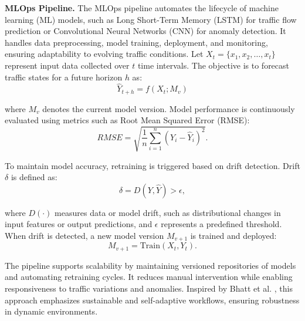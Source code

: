 \textbf{MLOps Pipeline.}  
The MLOps pipeline automates the lifecycle of machine learning (ML) models, such as Long Short-Term Memory (LSTM) for traffic flow prediction or Convolutional Neural Networks (CNN) for anomaly detection. It handles data preprocessing, model training, deployment, and monitoring, ensuring adaptability to evolving traffic conditions. Let $X_t = \{x_1, x_2, \dots, x_t\}$ represent input data collected over $t$ time intervals. The objective is to forecast traffic states for a future horizon $h$ as:
\vspace{0.5mm}
\[
\hat{Y}_{t+h} = f(X_t; M_v)
\]

\noindent where $M_v$ denotes the current model version. Model performance is continuously evaluated using metrics such as Root Mean Squared Error (RMSE):
\vspace{0.5mm}
\[
RMSE = \sqrt{\frac{1}{n} \sum_{i=1}^{n} (Y_i - \hat{Y}_i)^2}.
\]

\noindent To maintain model accuracy, retraining is triggered based on drift detection. Drift $\delta$ is defined as:
\vspace{0.5mm}
\[
\delta = D(Y, \hat{Y}) > \epsilon,
\]

\noindent where $D(\cdot)$ measures data or model drift, such as distributional changes in input features or output predictions, and $\epsilon$ represents a predefined threshold. When drift is detected, a new model version $M_{v+1}$ is trained and deployed:
\vspace{0.5mm}
\[
M_{v+1} = \text{Train}(X_t, Y_t).
\]

The pipeline supports scalability by maintaining versioned repositories of models and automating retraining cycles. It reduces manual intervention while enabling responsiveness to traffic variations and anomalies. Inspired by Bhatt et al. \cite{bhatt2024towards}, this approach emphasizes sustainable and self-adaptive workflows, ensuring robustness in dynamic environments.

